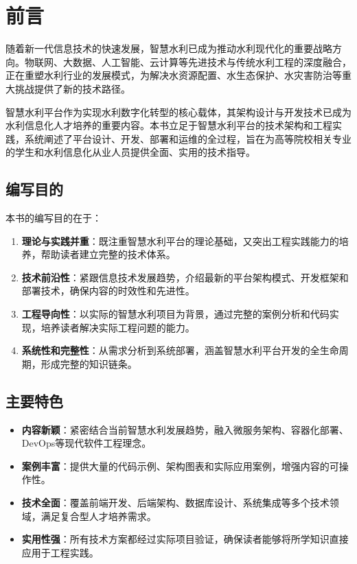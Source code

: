 
\chapter*{前\quad 言}

随着新一代信息技术的快速发展，智慧水利已成为推动水利现代化的重要战略方向。物联网、大数据、人工智能、云计算等先进技术与传统水利工程的深度融合，正在重塑水利行业的发展模式，为解决水资源配置、水生态保护、水灾害防治等重大挑战提供了新的技术路径。

智慧水利平台作为实现水利数字化转型的核心载体，其架构设计与开发技术已成为水利信息化人才培养的重要内容。本书立足于智慧水利平台的技术架构和工程实践，系统阐述了平台设计、开发、部署和运维的全过程，旨在为高等院校相关专业的学生和水利信息化从业人员提供全面、实用的技术指导。

\section*{编写目的}

本书的编写目的在于：

\begin{enumerate}
\item \textbf{理论与实践并重}：既注重智慧水利平台的理论基础，又突出工程实践能力的培养，帮助读者建立完整的技术体系。

\item \textbf{技术前沿性}：紧跟信息技术发展趋势，介绍最新的平台架构模式、开发框架和部署技术，确保内容的时效性和先进性。

\item \textbf{工程导向性}：以实际的智慧水利项目为背景，通过完整的案例分析和代码实现，培养读者解决实际工程问题的能力。

\item \textbf{系统性和完整性}：从需求分析到系统部署，涵盖智慧水利平台开发的全生命周期，形成完整的知识链条。
\end{enumerate}

\section*{主要特色}

\begin{itemize}
\item \textbf{内容新颖}：紧密结合当前智慧水利发展趋势，融入微服务架构、容器化部署、DevOps等现代软件工程理念。

\item \textbf{案例丰富}：提供大量的代码示例、架构图表和实际应用案例，增强内容的可操作性。

\item \textbf{技术全面}：覆盖前端开发、后端架构、数据库设计、系统集成等多个技术领域，满足复合型人才培养需求。

\item \textbf{实用性强}：所有技术方案都经过实际项目验证，确保读者能够将所学知识直接应用于工程实践。
\end{itemize}

